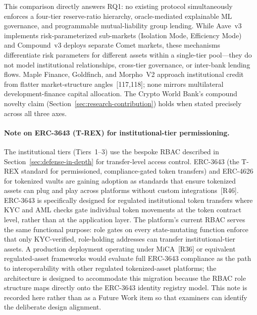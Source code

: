 \documentclass[12pt,a4paper]{report}
\begin{document}
This comparison directly answers RQ1: no existing protocol simultaneously enforces a four-tier reserve-ratio hierarchy, oracle-mediated explainable ML governance, and programmable mutual-liability group lending. While Aave~v3 implements risk-parameterized sub-markets (Isolation Mode, Efficiency Mode) and Compound~v3 deploys separate Comet markets, these mechanisms differentiate risk parameters for different assets within a single-tier pool---they do not model institutional relationships, cross-tier governance, or inter-bank lending flows. Maple Finance, Goldfinch, and Morpho~V2 approach institutional credit from flatter market-structure angles~[117,118]; none mirrors multilateral development-finance capital allocation. The Crypto World Bank's compound novelty claim (Section~\ref{sec:research-contribution}) holds when stated precisely across all three axes.

\paragraph{Note on ERC-3643 (T-REX) for institutional-tier permissioning.}
The institutional tiers (Tiers~1--3) use the bespoke RBAC described in Section~\ref{sec:defense-in-depth} for transfer-level access control.  ERC-3643 (the T-REX standard for permissioned, compliance-gated token transfers) and ERC-4626 for tokenized vaults are gaining adoption as standards that ensure tokenized assets can plug and play across platforms without custom integrations~[R46].  ERC-3643 is specifically designed for regulated institutional token transfers where KYC and AML checks gate individual token movements at the token contract level, rather than at the application layer.  The platform's current RBAC serves the same functional purpose: role gates on every state-mutating function enforce that only KYC-verified, role-holding addresses can transfer institutional-tier assets.  A production deployment operating under MiCA~[R36] or equivalent regulated-asset frameworks would evaluate full ERC-3643 compliance as the path to interoperability with other regulated tokenized-asset platforms; the architecture is designed to accommodate this migration because the RBAC role structure maps directly onto the ERC-3643 identity registry model.  This note is recorded here rather than as a Future Work item so that examiners can identify the deliberate design alignment.
\end{document}
